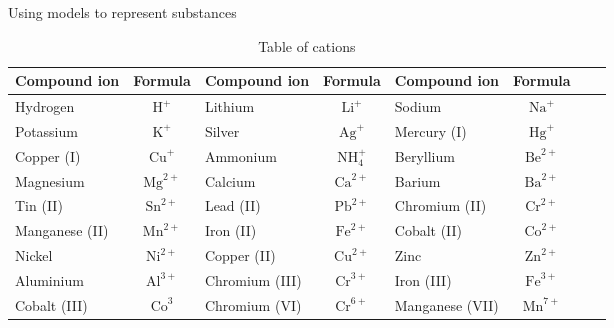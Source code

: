 \begin{activity}{Using models to represent substances}
\begin{enumerate}[noitemsep, label=\textbf{\arabic*}. ]
\begin{table}
\begin{center}
\begin{tabular}{|l|c|l|c|l|c|l|c|} \hline
\textbf{Compound ion} & \textbf{Formula} & \textbf{Compound ion} & \textbf{Formula} & \textbf{Compound ion} & \textbf{Formula}  \\ \hline
Hydrogen       & $\mathrm{H}^{+}$   & Lithium        & $\mathrm{Li}^{+}$     & Sodium          & $\mathrm{Na}^{+}$  \\ \hline
Potassium      & $\mathrm{K}^{+}$   & Silver         & $\mathrm{Ag}^{+}$     & Mercury (I)     & $\mathrm{Hg}^{+}$  \\ \hline
Copper (I)     & $\mathrm{Cu}^{+}$  & Ammonium       & $\mathrm{NH}_{4}^{+}$ & Beryllium       & $\mathrm{Be}^{2+}$ \\ \hline
Magnesium      & $\mathrm{Mg}^{2+}$ & Calcium        & $\mathrm{Ca}^{2+}$    & Barium          & $\mathrm{Ba}^{2+}$ \\ \hline
Tin (II)       & $\mathrm{Sn}^{2+}$ & Lead (II)      & $\mathrm{Pb}^{2+}$    & Chromium (II)   & $\mathrm{Cr}^{2+}$ \\ \hline
Manganese (II) & $\mathrm{Mn}^{2+}$ & Iron (II)      & $\mathrm{Fe}^{2+}$    & Cobalt (II)     & $\mathrm{Co}^{2+}$ \\ \hline
Nickel         & $\mathrm{Ni}^{2+}$ & Copper (II)    & $\mathrm{Cu}^{2+}$    & Zinc            & $\mathrm{Zn}^{2+}$ \\ \hline
Aluminium      & $\mathrm{Al}^{3+}$ & Chromium (III) & $\mathrm{Cr}^{3+}$    & Iron (III)      & $\mathrm{Fe}^{3+}$ \\ \hline
Cobalt (III)   & $\mathrm{Co}^{3}$  & Chromium (VI)  & $\mathrm{Cr}^{6+}$    & Manganese (VII) & $\mathrm{Mn}^{7+}$ \\ \hline

\end{tabular}

 \end{center}
\caption{Table of cations}
\label{tab:cations}
\end{table}

\begin{table}
\begin{center}


\end{center}
\end{table}
\end{enumerate}
\end{activity}
